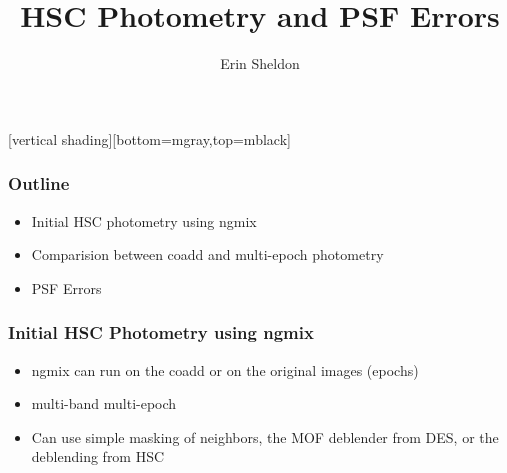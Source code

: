 \documentclass{beamer}
\title{HSC Photometry and PSF Errors}
\author{Erin Sheldon}
\institute{Brookhaven National Laboratory}
\begin{document}
\frame{\titlepage}


[vertical shading][bottom=mgray,top=mblack]

\frame
{
    \frametitle{Outline}

 
    \begin{itemize}

        \item Initial HSC photometry using ngmix
        \item Comparision between coadd and multi-epoch photometry
        \item PSF Errors

    \end{itemize}

}

\frame
{
    \frametitle{Initial HSC Photometry using ngmix}

 
    \begin{itemize}

        \item ngmix can run on the coadd or on the original images (epochs) 

        \item multi-band multi-epoch 

        \item Can use simple masking of neighbors, the MOF deblender from DES,
            or the deblending from HSC

    \end{itemize}

}
\end{document}
